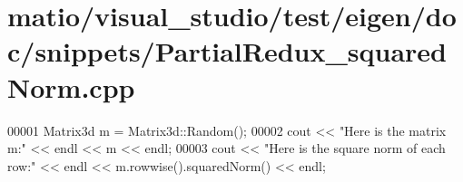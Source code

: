 \hypertarget{matio_2visual__studio_2test_2eigen_2doc_2snippets_2_partial_redux__squared_norm_8cpp_source}{}\section{matio/visual\+\_\+studio/test/eigen/doc/snippets/\+Partial\+Redux\+\_\+squared\+Norm.cpp}
\label{matio_2visual__studio_2test_2eigen_2doc_2snippets_2_partial_redux__squared_norm_8cpp_source}

\begin{DoxyCode}
00001 Matrix3d m = Matrix3d::Random();
00002 cout << \textcolor{stringliteral}{"Here is the matrix m:"} << endl << m << endl;
00003 cout << \textcolor{stringliteral}{"Here is the square norm of each row:"} << endl << m.rowwise().squaredNorm() << endl;
\end{DoxyCode}
